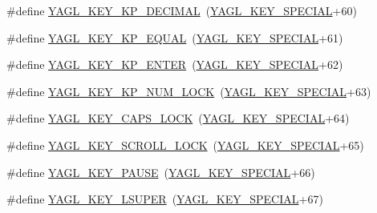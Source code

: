\begin{DoxyCompactItemize}
\item 
\#define \hyperlink{group____consts__key__mouse_gabf6302ba8f13022d91bb669d4136183e}{Y\-A\-G\-L\-\_\-\-K\-E\-Y\-\_\-\-K\-P\-\_\-\-D\-E\-C\-I\-M\-A\-L}~(\hyperlink{group____consts__key__mouse_gae6060c5e0a8f15c67d28e1a1f0765d7b}{Y\-A\-G\-L\-\_\-\-K\-E\-Y\-\_\-\-S\-P\-E\-C\-I\-A\-L}+60)
\item 
\#define \hyperlink{group____consts__key__mouse_gaa0a58b463efb68131a534f1542d840a2}{Y\-A\-G\-L\-\_\-\-K\-E\-Y\-\_\-\-K\-P\-\_\-\-E\-Q\-U\-A\-L}~(\hyperlink{group____consts__key__mouse_gae6060c5e0a8f15c67d28e1a1f0765d7b}{Y\-A\-G\-L\-\_\-\-K\-E\-Y\-\_\-\-S\-P\-E\-C\-I\-A\-L}+61)
\item 
\#define \hyperlink{group____consts__key__mouse_ga6c93df04acf3f29ccb71c9ff5df77aa0}{Y\-A\-G\-L\-\_\-\-K\-E\-Y\-\_\-\-K\-P\-\_\-\-E\-N\-T\-E\-R}~(\hyperlink{group____consts__key__mouse_gae6060c5e0a8f15c67d28e1a1f0765d7b}{Y\-A\-G\-L\-\_\-\-K\-E\-Y\-\_\-\-S\-P\-E\-C\-I\-A\-L}+62)
\item 
\#define \hyperlink{group____consts__key__mouse_gafff77074570cff5a9d0a18c43553f716}{Y\-A\-G\-L\-\_\-\-K\-E\-Y\-\_\-\-K\-P\-\_\-\-N\-U\-M\-\_\-\-L\-O\-C\-K}~(\hyperlink{group____consts__key__mouse_gae6060c5e0a8f15c67d28e1a1f0765d7b}{Y\-A\-G\-L\-\_\-\-K\-E\-Y\-\_\-\-S\-P\-E\-C\-I\-A\-L}+63)
\item 
\#define \hyperlink{group____consts__key__mouse_gaf6349f59efe1435c4709b04b9a931b95}{Y\-A\-G\-L\-\_\-\-K\-E\-Y\-\_\-\-C\-A\-P\-S\-\_\-\-L\-O\-C\-K}~(\hyperlink{group____consts__key__mouse_gae6060c5e0a8f15c67d28e1a1f0765d7b}{Y\-A\-G\-L\-\_\-\-K\-E\-Y\-\_\-\-S\-P\-E\-C\-I\-A\-L}+64)
\item 
\#define \hyperlink{group____consts__key__mouse_gae0a7fd0d6cb8fe49deec686e9740e879}{Y\-A\-G\-L\-\_\-\-K\-E\-Y\-\_\-\-S\-C\-R\-O\-L\-L\-\_\-\-L\-O\-C\-K}~(\hyperlink{group____consts__key__mouse_gae6060c5e0a8f15c67d28e1a1f0765d7b}{Y\-A\-G\-L\-\_\-\-K\-E\-Y\-\_\-\-S\-P\-E\-C\-I\-A\-L}+65)
\item 
\#define \hyperlink{group____consts__key__mouse_ga50dcf86a8305219608a372692defaeee}{Y\-A\-G\-L\-\_\-\-K\-E\-Y\-\_\-\-P\-A\-U\-S\-E}~(\hyperlink{group____consts__key__mouse_gae6060c5e0a8f15c67d28e1a1f0765d7b}{Y\-A\-G\-L\-\_\-\-K\-E\-Y\-\_\-\-S\-P\-E\-C\-I\-A\-L}+66)
\item 
\#define \hyperlink{group____consts__key__mouse_gaf1a63cc2a457d68cd5a23f9d0d82277c}{Y\-A\-G\-L\-\_\-\-K\-E\-Y\-\_\-\-L\-S\-U\-P\-E\-R}~(\hyperlink{group____consts__key__mouse_gae6060c5e0a8f15c67d28e1a1f0765d7b}{Y\-A\-G\-L\-\_\-\-K\-E\-Y\-\_\-\-S\-P\-E\-C\-I\-A\-L}+67)

\end{DoxyCompactItemize}
